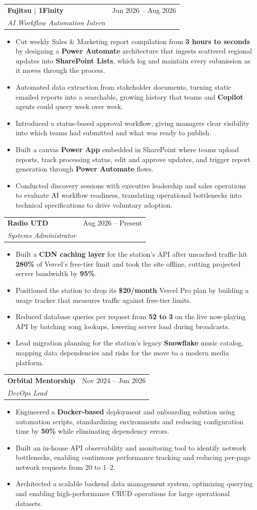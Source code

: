 \documentclass[letterpaper,11pt]{article}
\makeatletter
\newcommand{\resumeItem}[1]{\item\small{{#1 \vspace{-2pt}}}}
\newcommand{\resumeSubheading}[4]{
  \vspace{-2pt}\item
    \begin{tabular*}{0.97\textwidth}[t]{l@{\extracolsep{\fill}}r}
      \textbf{#1} & #2 \\
      \textit{\small#3} & \textit{\small #4} \\
    \end{tabular*}\vspace{-7pt}
}
\newcommand{\resumeItemListStart}{\begin{itemize}}
\newcommand{\resumeItemListEnd}{\end{itemize}\vspace{-5pt}}
\makeatother
\begin{document}
    \resumeSubheading
      {Fujitsu $|$ 1Finity}{Jun 2026 -- Aug 2026}
      {AI Workflow Automation Intern}{}
      \resumeItemListStart
        \resumeItem{Cut weekly Sales \& Marketing report compilation from \textbf{3 hours to seconds} by designing a \textbf{Power Automate} architecture that ingests scattered regional updates into \textbf{SharePoint Lists}, which log and maintain every submission as it moves through the process.}
        \resumeItem{Automated data extraction from stakeholder documents, turning static emailed reports into a searchable, growing history that teams and \textbf{Copilot} agents could query week over week.}
        \resumeItem{Introduced a status-based approval workflow, giving managers clear visibility into which teams had submitted and what was ready to publish.}
        \resumeItem{Built a canvas \textbf{Power App} embedded in SharePoint where teams upload reports, track processing status, edit and approve updates, and trigger report generation through \textbf{Power Automate} flows.}
        \resumeItem{Conducted discovery sessions with executive leadership and sales operations to evaluate AI workflow readiness, translating operational bottlenecks into technical specifications to drive voluntary adoption.}
      \resumeItemListEnd

    \resumeSubheading
      {Radio UTD}{Aug 2026 -- Present}
      {Systems Administrator}{}
      \resumeItemListStart
        \resumeItem{Built a \textbf{CDN caching layer} for the station's API after uncached traffic hit \textbf{280\%} of Vercel's free-tier limit and took the site offline, cutting projected server bandwidth by \textbf{95\%}.}
        \resumeItem{Positioned the station to drop its \textbf{\$20/month} Vercel Pro plan by building a usage tracker that measures traffic against free-tier limits.}
        \resumeItem{Reduced database queries per request from \textbf{52 to 3} on the live now-playing API by batching song lookups, lowering server load during broadcasts.}
        \resumeItem{Lead migration planning for the station's legacy \textbf{Snowflake} music catalog, mapping data dependencies and risks for the move to a modern media platform.}
      \resumeItemListEnd

    \resumeSubheading
      {Orbital Mentorship}{Nov 2024 -- Jun 2026}
      {DevOps Lead}{}
      \resumeItemListStart
        \resumeItem{Engineered a \textbf{Docker-based} deployment and onboarding solution using automation scripts, standardizing environments and reducing configuration time by \textbf{50\%} while eliminating dependency errors.}
        \resumeItem{Built an in-house API observability and monitoring tool to identify network bottlenecks, enabling continuous performance tracking and reducing per-page network requests from 20 to 1--2.}
        \resumeItem{Architected a scalable backend data management system, optimizing querying and enabling high-performance CRUD operations for large operational datasets.}
      \resumeItemListEnd
\end{document}
